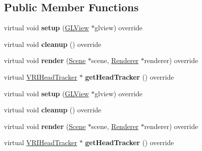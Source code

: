 \subsection*{Public Member Functions}
\begin{DoxyCompactItemize}
\item 
\mbox{\label{classVRGenericRenderer_a42030fa2e1f716d4949afdae5595fea9}} 
virtual void {\bfseries setup} (\hyperlink{classGLView}{G\+L\+View} $\ast$glview) override
\item 
\mbox{\label{classVRGenericRenderer_afd7c79b90859a4c68424ca242064ec14}} 
virtual void {\bfseries cleanup} () override
\item 
\mbox{\label{classVRGenericRenderer_a0c552a0ac8c09d817a5ef3d242c58db9}} 
virtual void {\bfseries render} (\hyperlink{classScene}{Scene} $\ast$scene, \hyperlink{classRenderer}{Renderer} $\ast$renderer) override
\item 
\mbox{\label{classVRGenericRenderer_a0c6a6ae7dba2c4aa90b76aae42ab8009}} 
virtual \hyperlink{classVRIHeadTracker}{V\+R\+I\+Head\+Tracker} $\ast$ {\bfseries get\+Head\+Tracker} () override
\item 
\mbox{\label{classVRGenericRenderer_aa05542b3e6281c50b6f7d28d487a37be}} 
virtual void {\bfseries setup} (\hyperlink{classGLView}{G\+L\+View} $\ast$glview) override
\item 
\mbox{\label{classVRGenericRenderer_ae1fe60a40841f8a4f2f284a1dc4c3030}} 
virtual void {\bfseries cleanup} () override
\item 
\mbox{\label{classVRGenericRenderer_a77759425a922ad53cea2da4a7c8fe4dc}} 
virtual void {\bfseries render} (\hyperlink{classScene}{Scene} $\ast$scene, \hyperlink{classRenderer}{Renderer} $\ast$renderer) override
\item 
\mbox{\label{classVRGenericRenderer_acb5121fcd984ef05b3157a9ca1d8e0a4}} 
virtual \hyperlink{classVRIHeadTracker}{V\+R\+I\+Head\+Tracker} $\ast$ {\bfseries get\+Head\+Tracker} () override
\end{DoxyCompactItemize}
